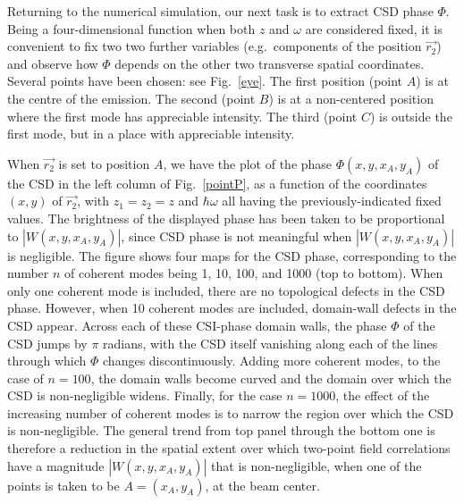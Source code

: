 \documentclass[%
 reprint,
 amsmath,amssymb,
 aps,
]{revtex4-1}
\begin{document}
Returning to the numerical simulation, our next task is to extract CSD phase $\Phi$. Being a four-dimensional function when both $z$ and $\omega$ are considered fixed, it is convenient to fix two two further variables (e.g.~components of the position $\vec{r_2}$) and observe how $\Phi$ depends on the other two transverse spatial coordinates. Several points have been chosen: see Fig.~\ref{eye}. The first position (point $A$) is at the centre of the emission. The second (point $B$) is at a non-centered position where the first mode has appreciable intensity. The third (point $C$) is outside the first mode, but in a place with appreciable intensity.

When $\vec{r_2}$ is set to position $A$, we have the plot of the phase $\Phi(x,y,x_A,y_A)$ of the CSD in the left column of Fig.~\ref{pointP}, as a function of the coordinates $(x,y)$ of $\vec{r_2}$, with $z_1=z_2=z$ and $\hbar\omega$ all having the previously-indicated fixed values.  The brightness of the displayed phase has been taken to be proportional to $|W(x,y,x_A,y_A)|$, since CSD phase is not meaningful when $|W(x,y,x_A,y_A)|$ is negligible.  The figure shows four maps for the CSD phase, corresponding to the number $n$ of coherent modes being 1, 10, 100, and 1000 (top to bottom).  When only one coherent mode is included, there are no topological defects in the CSD phase.  However, when 10 coherent modes are included, domain-wall defects in the CSD appear.  Across each of these CSI-phase domain walls, the phase $\Phi$ of the CSD jumps by $\pi$ radians, with the CSD itself vanishing along each of the lines through which $\Phi$ changes discontinuously.  Adding more coherent modes, to the case of $n=100$, the domain walls become curved and the domain over which the CSD is non-negligible widens.  Finally, for the case  $n=1000$, the effect of the increasing number of coherent modes is to narrow the region over which the CSD is non-negligible.  The general trend from top panel through the bottom one is therefore a reduction in the spatial extent over which two-point field correlations have a magnitude $|W(x,y,x_A,y_A)|$ that is non-negligible, when one of the points is taken to be $A=(x_A,y_A)$, at the beam center.      
\end{document}
